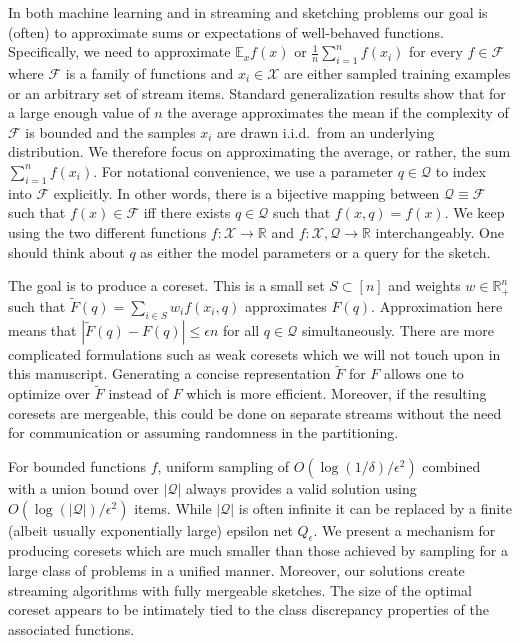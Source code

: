 \documentclass[12pt]{colt2019} %
\newcommand{\R}{\mathbb{R}}
\newcommand{\E}{\mathbb{E}}
\newcommand{\eps}{\epsilon}
\newcommand{\F}{\mathcal{F}}
\newcommand{\X}{\mathcal{X}}
\newcommand{\Q}{\mathcal{Q}}
\begin{document}
In both machine learning and in streaming and sketching problems our goal is (often) to approximate sums or expectations of well-behaved functions.
Specifically, we need to approximate $\E_x f(x)$ or $\frac{1}{n}\sum_{i=1}^{n} f(x_i)$ for every $f\in \F$ where $\F$ is a family of functions and $x_i \in \X$ are either sampled training examples or an arbitrary set of stream items. 
Standard generalization results show that for a large enough value of $n$ the average approximates the mean if the complexity of $\F$ is bounded and the samples $x_i$ are drawn i.i.d.\ from an underlying distribution. We therefore focus on approximating the average, or rather, the sum $\sum_{i=1}^{n} f(x_i)$. 
For notational convenience, we use a parameter $q \in \Q$ to index into $\F$ explicitly. 
In other words, there is a bijective mapping between $\Q \equiv \F$ such that $f(x) \in \F$ iff there exists $q\in\Q$ such that $f(x,q)=f(x)$.
We keep using the two different functions $f:\X\rightarrow\R$ and $f:\X,\Q\rightarrow\R$ interchangeably. 
One should think about $q$ as either the model parameters or a query for the sketch. 

The goal is to produce a coreset. This is a small set $S\subset [n]$ and weights $w \in\R_+^{n}$ such that $\tilde F(q) = \sum_{i \in S} w_i f(x_i,q)$ approximates $F(q)$.
Approximation here means that $|\tilde F(q)  - F(q)| \le \eps n$ for all $q \in \mathcal Q$ simultaneously. 
There are more complicated formulations such as weak coresets which we will not touch upon in this manuscript. 
Generating a concise representation $\tilde F$ for $F$ allows one to optimize over $\tilde F$ instead of $F$ which is more efficient. 
Moreover, if the resulting coresets are mergeable, this could be done on separate streams without the need for communication or assuming randomness in the partitioning.

For bounded functions $f$, uniform sampling of $O(\log(1/\delta)/\eps^2)$ combined with a union bound over $|\mathcal Q|$ always provides a valid solution using $O(\log(|\mathcal Q|)/\eps^2)$ items. 
While $|\mathcal Q|$ is often infinite it can be replaced by a finite (albeit usually exponentially large) epsilon net $Q_\eps$. 
%
We present a mechanism for producing coresets which are much smaller than those achieved by sampling for a large class of problems in a unified manner.  
Moreover, our solutions create streaming algorithms with fully mergeable sketches. 
The size of the optimal coreset appears to be intimately tied to the class discrepancy properties of the associated functions.
\end{document}

